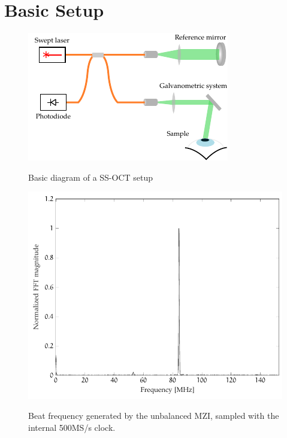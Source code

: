 \section{Basic Setup}
\begin{figure}[bth]
\myfloatalign
{\includegraphics[width=0.8\linewidth]{gfx/setup-diagrams/basic-oct.pdf}}
\caption{Basic diagram of a  SS-OCT setup}\label{fig:basic-oct}
\end{figure}


\begin{figure}[hbt]
{\myfloatalign
\includegraphics[width=\linewidth]{gfx/tikz/interferometer/internal-clock/frequency}}
\caption{Beat frequency generated by the unbalanced \ac{MZI}, sampled with the internal 500MS/s clock.}\label{fig:mzi-internal}
\end{figure}

